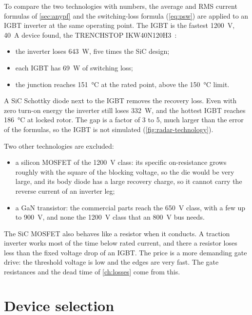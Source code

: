To compare the two technologies with numbers, the average and RMS current
formulas of \cref{sec:anypf} and the switching-loss formula
(\cref{eq:psw}) are applied to an IGBT inverter at the same operating point. The IGBT
is the fastest \SI{1200}{\volt}, \SI{40}{\ampere} device found, the
TRENCHSTOP IKW40N120H3~\cite{infineon_ikw40n120h3}:
\begin{itemize}
  \item the inverter loses \SI{643}{\watt}, five times the SiC design;
  \item each IGBT has \SI{69}{\watt} of switching loss;
  \item the junction reaches \SI{151}{\celsius} at the rated point, above
        the \SI{150}{\celsius} limit.
\end{itemize}
A SiC Schottky diode next to the IGBT removes the recovery loss. Even with
zero turn-on energy the inverter still loses \SI{332}{\watt}, and the hottest
IGBT reaches \SI{186}{\celsius} at locked rotor. The gap is a factor of 3 to
5, much larger than the error of the formulas, so the IGBT is not
simulated (\cref{fig:radar-technology}).

Two other technologies are excluded:
\begin{itemize}
  \item a silicon MOSFET of the \SI{1200}{\volt} class: its specific
        on-resistance grows roughly with the square of the blocking voltage,
        so the die would be very large, and its body diode has a large
        recovery charge, so it cannot carry the reverse current of an
        inverter leg;
  \item a GaN transistor: the commercial parts reach the \SI{650}{\volt}
        class, with a few up to \SI{900}{\volt}, and none the
        \SI{1200}{\volt} class that an \SI{800}{\volt} bus needs.
\end{itemize}

The SiC MOSFET also behaves like a resistor when it conducts. A traction
inverter works most of the time below rated current, and there a resistor
loses less than the fixed voltage drop of an IGBT. The price is a more
demanding gate drive: the threshold voltage is low and the edges are very
fast. The gate resistances and the dead time of \cref{ch:losses} come from
this.

\section{Device selection}
\label{sec:deviceselection}

